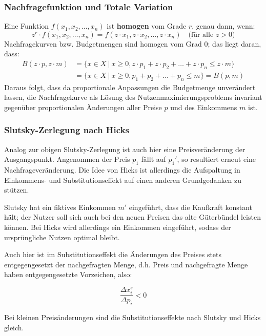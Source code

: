 
\subsubsection*{Nachfragefunktion und Totale Variation}

Eine Funktion $f(x_1 ,x_2, \dotsc, x_n)$ ist \textbf{homogen} vom Grade $r$, genau dann, wenn:
$$ z^r \cdot f(x_1, x_2, \dotsc, x_n) = f(z \cdot x_1, z \cdot x_2, \dotsc, z \cdot x_n) \quad \text{(für alle $z > 0$)} $$
Nachfragekurven bzw. Budgetmengen sind homogen vom Grad 0; das liegt daran, dass:
\begin{align*}
	B(z \cdot p, z \cdot m) & = \{ x \in X ~|~ x \geq 0, z \cdot p_1 + z \cdot p_2 + \dotsc + z \cdot p_n \leq z \cdot m \} \\
	& = \{ x \in X ~|~ x \geq 0, p_1 + p_2 + \dotsc + p_n \leq m \} = B(p, m)
\end{align*}
Daraus folgt, dass da proportionale Anpassungen die Budgetmenge unverändert lassen, die Nachfragekurve als Lösung des Nutzenmaximierungsproblems invariant gegenüber proportionalen Änderungen aller Preise $p$ und des Einkommens $m$ ist. 

\subsubsection*{Slutsky-Zerlegung nach Hicks}

Analog zur obigen Slutsky-Zerlegung ist auch hier eine Preisveränderung der Ausgangspunkt. Angenommen der Preis $p_1$ fällt auf $p_1'$, so resultiert erneut eine Nachfrageveränderung. Die Idee von Hicks ist allerdings die Aufspaltung in Einkommens- und Substitutionseffekt auf einen anderen Grundgedanken zu stützen. ~\bigskip

Slutsky hat ein fiktives Einkommen $m'$ eingeführt, dass die Kaufkraft konstant hält; der Nutzer soll sich auch bei den neuen Preisen das alte Güterbündel leisten können. Bei Hicks wird allerdings ein Einkommen eingeführt, sodass der ursprüngliche Nutzen optimal bleibt. ~\bigskip %

Auch hier ist im Substitutionseffekt die Änderungen des Preises stets entgegengesetzt der nachgefragten Menge, d.h. Preis und nachgefragte Menge haben entgegengesetzte Vorzeichen, also: %

$$ \frac{\Delta x_i^s}{\Delta p_i} < 0 $$

Bei kleinen Preisänderungen sind die  Substitutionseffekte nach Slutsky und Hicks gleich.